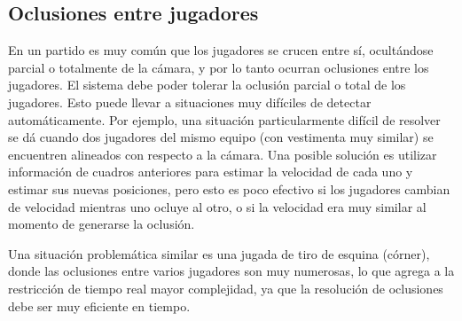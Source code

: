 
\subsection{Oclusiones entre jugadores}

En un partido es muy común que los jugadores se crucen entre sí, ocultándose
parcial o totalmente de la cámara, y por lo tanto ocurran oclusiones entre los
jugadores. El sistema debe poder tolerar la oclusión parcial o total de los jugadores.
Esto puede llevar a situaciones muy difíciles de detectar automáticamente. Por
ejemplo, una situación particularmente difícil de resolver se dá cuando dos
jugadores del mismo equipo (con vestimenta muy similar) se encuentren alineados
con respecto a la cámara. Una posible solución es utilizar información de
cuadros anteriores para estimar la velocidad de cada uno y estimar sus nuevas
posiciones, pero esto es poco efectivo si los jugadores cambian de velocidad
mientras uno ocluye al otro, o si la velocidad era muy similar al momento de
generarse la oclusión.

Una situación problemática similar es una jugada de tiro de esquina (córner),
donde las oclusiones entre varios jugadores son muy numerosas, lo que agrega a
la restricción de tiempo real mayor complejidad, ya que la resolución de
oclusiones debe ser muy eficiente en tiempo.

